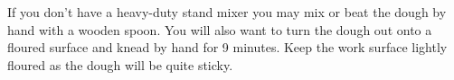 \begin{ChefNotes}
    {If you don't have a heavy-duty stand mixer you may mix or beat the dough by
        hand with a wooden spoon. You will also want to turn the dough out onto a floured
        surface and knead by hand for 9 minutes. Keep the work surface lightly floured as
        the dough will be quite sticky.}
\end{ChefNotes}
